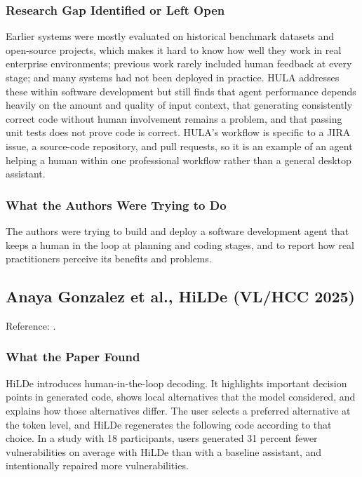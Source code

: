\documentclass[11pt,a4paper]{report}
\begin{document}
\subsubsection{Research Gap Identified or Left Open}

Earlier systems were mostly evaluated on historical benchmark datasets
and open-source projects, which makes it hard to know how well they
work in real enterprise environments; previous work rarely included
human feedback at every stage; and many systems had not been deployed
in practice. HULA addresses these within software development but still
finds that agent performance depends heavily on the amount and quality
of input context, that generating consistently correct code without
human involvement remains a problem, and that passing unit tests does
not prove code is correct. HULA's workflow is specific to a JIRA issue,
a source-code repository, and pull requests, so it is an example of an
agent helping a human within one professional workflow rather than a
general desktop assistant.

\subsubsection{What the Authors Were Trying to Do}

The authors were trying to build and deploy a software development agent
that keeps a human in the loop at planning and coding stages, and to
report how real practitioners perceive its benefits and problems.

\subsection{Anaya Gonzalez et al., HiLDe (VL/HCC 2025)}

\noindent Reference: \autocite{gonzalez2025hilde}.

\subsubsection{What the Paper Found}

HiLDe introduces human-in-the-loop decoding. It highlights important
decision points in generated code, shows local alternatives that the
model considered, and explains how those alternatives differ. The user
selects a preferred alternative at the token level, and HiLDe
regenerates the following code according to that choice. In a study
with 18 participants, users generated 31 percent fewer vulnerabilities
on average with HiLDe than with a baseline assistant, and intentionally
repaired more vulnerabilities.
\end{document}
